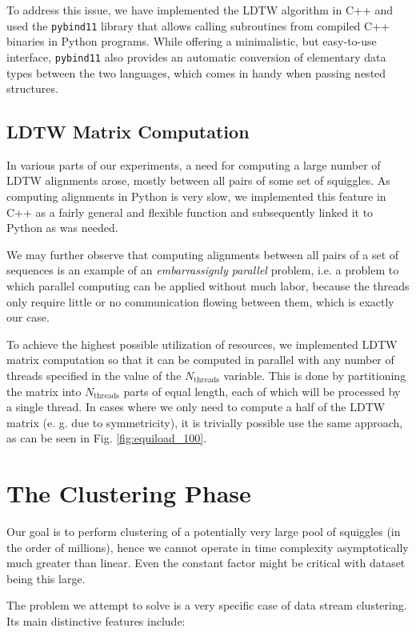 To address this issue, we have implemented the LDTW algorithm in C++ and used the \texttt{pybind11} \cite{pybind11} library that allows calling subroutines from compiled C++ binaries in Python programs. While offering a minimalistic, but easy-to-use interface, \texttt{pybind11} also provides an automatic conversion of elementary data types between the two languages, which comes in handy when passing nested structures.

\subsection{LDTW Matrix Computation}
In various parts of our experiments, a need for computing a large number of LDTW alignments arose, mostly between all pairs of some set of squiggles. As computing alignments in Python is very slow, we implemented this feature in C++ as a fairly general and flexible function and subsequently linked it to Python as was needed.

We may further observe that computing alignments between all pairs of a set of sequences is an example of an \textit{embarrassignly parallel} \cite{multiprocessor} problem, i.e. a problem to which parallel computing can be applied without much labor, because the threads only require little or no communication flowing between them, which is exactly our case.

To achieve the highest possible utilization of resources, we implemented LDTW matrix computation so that it can be computed in parallel with any number of threads specified in the value of the $N_{\text{threads}}$ variable. This is done by partitioning the matrix into $N_{\text{threads}}$ parts of equal length, each of which will be processed by a single thread. In cases where we only need to compute a half of the LDTW matrix (e. g. due to symmetricity), it is trivially possible use the same approach, as can be seen in Fig. \ref{fig:equiload_100}.


\section{The Clustering Phase}
Our goal is to perform clustering of a potentially very large pool of squiggles (in the order of millions), hence we cannot operate in time complexity asymptotically much greater than linear. Even the constant factor might be critical with dataset being this large.

The problem we attempt to solve is a very specific case of data stream clustering. Its main distinctive features include:


